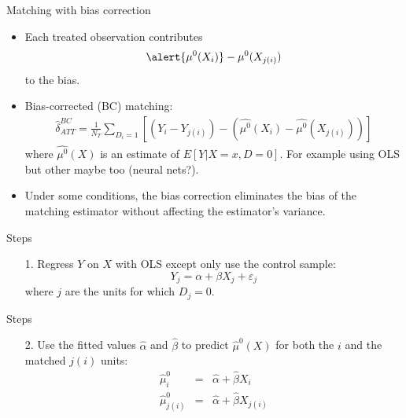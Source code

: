 \documentclass{beamer}
\begin{document}
 
\begin{frame}{Matching with bias correction}
	
	\begin{itemize}
	\item Each treated observation contributes$$\alert{\mu^0(X_i)} - \mu^0(X_{j(i)})$$to the bias.
	\item Bias-corrected (BC) matching:
		\begin{eqnarray*}
		\widehat{\delta}_{ATT}^{BC} = \frac{1}{N_T} \sum_{D_i=1} \left[ (Y_i - Y_{j(i)}) - ( \widehat{\mu^0}(X_i) - \widehat{\mu^0}(X_{j(i)}) ) \right]
		\end{eqnarray*}where $\widehat{\mu^0}(X)$ is an estimate of $E[Y|X=x,D=0]$.  For example using OLS but other maybe too (neural nets?).  
	\item Under some conditions, the bias correction eliminates the bias of the matching estimator without affecting the estimator's variance.
	\end{itemize}
\end{frame}


\begin{frame}{Steps}

\begin{enumerate}
\item[1.  ]Regress $Y$ on $X$ with OLS except only use the control sample:
\begin{equation}
Y_j = \alpha + \beta X_j + \varepsilon_j \nonumber
\end{equation}where $j$ are the units for which $D_j=0$.  
\end{enumerate}

\end{frame}

\begin{frame}{Steps}

\begin{enumerate}
\item[2. ] Use the fitted values $\widehat{\alpha}$ and $\widehat{\beta}$ to predict $\widehat{\mu}^0(X)$ for both the $i$ and the matched $j(i)$ units:
\begin{eqnarray}
\widehat{\mu}^0_i &=& \widehat{\alpha} + \widehat{\beta} X_i \nonumber \\
\widehat{\mu}^0_{j(i)} &=& \widehat{\alpha} + \widehat{\beta} X_{j(i)} \nonumber
\end{eqnarray}
\end{enumerate}

\end{frame}
\end{document}
